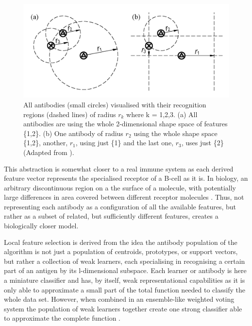 \begin{figure}[H]
    \centering
    \includegraphics[width=1.0\columnwidth]{figs/LFS.PNG}
    \caption[Local feature selection example]
    {All antibodies (small circles) visualised with their recognition regions (dashed lines) of radius $r_k$ where k = 1,2,3. (a) All antibodies are using the whole 2-dimensional shape space of features \{1,2\}. (b) One antibody of radius $r_2$ using the whole shape space \{1,2\}, another, $r_1$, using just \{1\} and the last one, $r_3$, uses just \{2\} (Adapted from \cite{AIS:LFS}).}
    \label{fig:LFS}
\end{figure}

This abstraction is somewhat closer to a real immune system as each derived feature vector represents the specialised receptor of a B-cell as it is. In biology, an arbitrary discontinuous region on a the surface of a molecule, with potentially large differences in area covered between different receptor molecules \cite{AIS:representation-in-ais}. Thus, not representing each antibody as a configuration of all the available features, but rather as a subset of related, but sufficiently different features, creates a biologically closer model. 

Local feature selection is derived from the idea the antibody population of the algorithm is not just a population of centroids, prototypes, or support vectors, but rather a collection of weak learners, each specialising in recognising a certain part of an antigen by its l-dimensional subspace. Each learner or antibody is here a miniature classifier and has, by itself, weak representational capabilities as it is only able to approximate a small part of the total function needed to classify the whole data set. However, when combined in an ensemble-like weighted voting system the population of weak learners together create one strong classifier able to approximate the complete function \cite{AIS:LFS}. 

